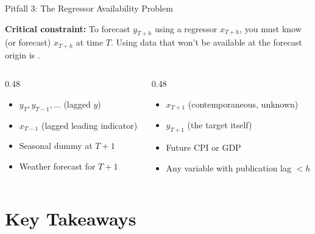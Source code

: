 \documentclass[aspectratio=169, 11pt]{beamer}
\begin{document}
\begin{frame}{Pitfall 3: The Regressor Availability Problem}
  \begin{warningbox}
    \textbf{Critical constraint:} To forecast $y_{T+h}$ using a regressor
    $x_{T+h}$, you must know (or forecast) $x_{T+h}$ at time $T$.
    Using data that won't be available at the forecast origin is
    .
  \end{warningbox}
  \vspace{0.15cm}
  \begin{columns}[T]
    \begin{column}{0.48\textwidth}
      \textbf{}
      \begin{itemize}
        \item[\pos{$\checkmark$}] $y_T, y_{T-1}, \ldots$ (lagged $y$)
        \item[\pos{$\checkmark$}] $x_{T-1}$ (lagged leading indicator)
        \item[\pos{$\checkmark$}] Seasonal dummy at $T+1$
        \item[\pos{$\checkmark$}] Weather forecast for $T+1$
      \end{itemize}
    \end{column}
    \begin{column}{0.48\textwidth}
      \textbf{}
      \begin{itemize}
        \item[\negc{$\times$}] $x_{T+1}$ (contemporaneous, unknown)
        \item[\negc{$\times$}] $y_{T+1}$ (the target itself)
        \item[\negc{$\times$}] Future CPI or GDP
        \item[\negc{$\times$}] Any variable with
              publication lag $< h$
      \end{itemize}
    \end{column}
  \end{columns}
\end{frame}

\section*{Key Takeaways}
\end{document}
